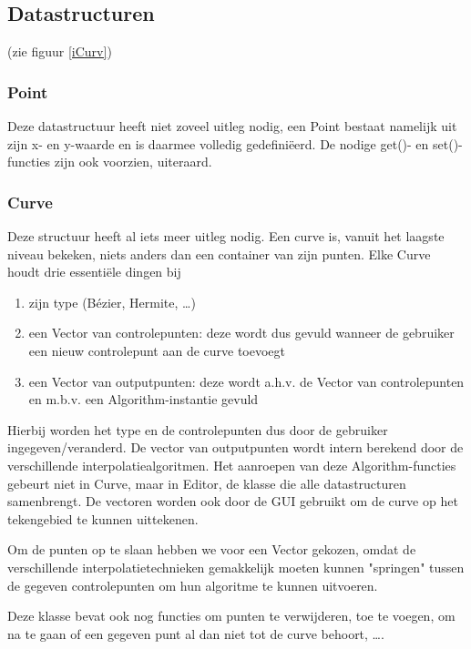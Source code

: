 \documentclass[a4paper,11pt,oneside, titlepage]{article}
\begin{document}
\subsection{Datastructuren}
(zie figuur \ref{iCurv})
\subsubsection{Point}
Deze datastructuur heeft niet zoveel uitleg nodig, een Point bestaat namelijk uit zijn x- en y-waarde en is daarmee
volledig gedefini\"eerd. De nodige get()- en set()-functies zijn ook voorzien, uiteraard.
\subsubsection{Curve}
Deze structuur heeft al iets meer uitleg nodig. Een curve is, vanuit het laagste niveau bekeken, niets 
anders dan een container van zijn punten.\newline
Elke Curve houdt drie essenti\"ele dingen bij
\begin{enumerate}
\item zijn type (B\'ezier, Hermite, \ldots)
\item een Vector van controlepunten: deze wordt dus gevuld wanneer de gebruiker een nieuw controlepunt aan de curve toevoegt
\item een Vector van outputpunten: deze wordt a.h.v. de Vector van controlepunten en m.b.v. een Algorithm-instantie gevuld
\end{enumerate}

Hierbij worden het type en de controlepunten dus door de gebruiker ingegeven/veranderd. De vector van outputpunten
wordt intern berekend door de verschillende interpolatiealgoritmen. Het aanroepen van deze Algorithm-functies gebeurt niet in Curve, maar in Editor, de klasse die alle datastructuren samenbrengt.
De vectoren worden ook door de GUI gebruikt om de curve op het tekengebied te kunnen uittekenen.\newline

Om de punten op te slaan hebben we voor een Vector gekozen, omdat de verschillende
interpolatietechnieken gemakkelijk moeten kunnen "springen" tussen de gegeven controlepunten om
hun algoritme te kunnen uitvoeren.

Deze klasse bevat ook nog functies om punten te verwijderen, toe te voegen, om na te gaan of een gegeven punt al dan niet tot de curve behoort, \ldots.
\end{document}
